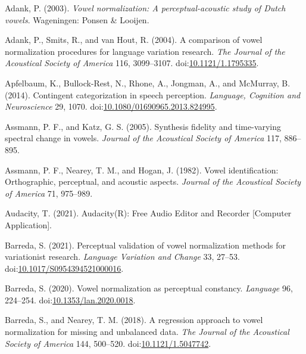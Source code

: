 \documentclass[utf8]{frontiersSCNS}
\newlength{\cslhangindent}
\newlength{\cslentryspacingunit} %
\newenvironment{CSLReferences}[2] %
 {%
  \setlength{\parindent}{0pt}
  \ifodd #1
  \let\oldpar\par
  \def\par{\hangindent=\cslhangindent\oldpar}
  \fi
  \setlength{\parskip}{#2\cslentryspacingunit}
 }%
 {}
\begin{document}
\hypertarget{refs}{}
\begin{CSLReferences}{1}{0}
\leavevmode{}%
Adank, P. (2003). \emph{Vowel normalization: A perceptual-acoustic study of {Dutch} vowels}. {Wageningen}: {Ponsen \& Looijen}.

\leavevmode{}%
Adank, P., Smits, R., and van Hout, R. (2004). A comparison of vowel normalization procedures for language variation research. \emph{The Journal of the Acoustical Society of America} 116, 3099--3107. doi:\href{https://doi.org/10.1121/1.1795335}{10.1121/1.1795335}.

\leavevmode{}%
Apfelbaum, K., Bullock-Rest, N., Rhone, A., Jongman, A., and McMurray, B. (2014). Contingent categorization in speech perception. \emph{Language, Cognition and Neuroscience} 29, 1070. doi:\href{https://doi.org/10.1080/01690965.2013.824995}{10.1080/01690965.2013.824995}.

\leavevmode{}%
Assmann, P. F., and Katz, G. S. (2005). Synthesis fidelity and time-varying spectral change in vowels. \emph{Journal of the Acoustical Society of America} 117, 886--895.

\leavevmode{}%
Assmann, P. F., Nearey, T. M., and Hogan, J. (1982). Vowel identification: {Orthographic}, perceptual, and acoustic aspects. \emph{Journal of the Acoustical Society of America} 71, 975--989.

\leavevmode{}%
Audacity, T. (2021). Audacity({R}): {Free Audio Editor} and {Recorder} {[}{Computer Application}{]}.

\leavevmode{}%
Barreda, S. (2021). Perceptual validation of vowel normalization methods for variationist research. \emph{Language Variation and Change} 33, 27--53. doi:\href{https://doi.org/10.1017/S0954394521000016}{10.1017/S0954394521000016}.

\leavevmode{}%
Barreda, S. (2020). Vowel normalization as perceptual constancy. \emph{Language} 96, 224--254. doi:\href{https://doi.org/10.1353/lan.2020.0018}{10.1353/lan.2020.0018}.

\leavevmode{}%
Barreda, S., and Nearey, T. M. (2018). A regression approach to vowel normalization for missing and unbalanced data. \emph{The Journal of the Acoustical Society of America} 144, 500--520. doi:\href{https://doi.org/10.1121/1.5047742}{10.1121/1.5047742}.


\end{CSLReferences}
\end{document}
